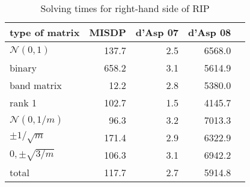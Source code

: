 \begin{table} 
 \begin{scriptsize} \caption{Solving times for right-hand side of RIP} 
 \label{rhsTime} 
 \begin{tabular*}{\linewidth}{@{}l@{\;\;\extracolsep{\fill}}rrrr@{}}\toprule 
 type of matrix & MISDP & d'Asp 07 & d'Asp 08 \\ \midrule 
$\mathcal{N}(0,1)$& \num{137.7} & \num{2.5} & \num{6568.0} \\ 
 binary& \num{658.2} & \num{3.1} & \num{5614.9} \\ 
 band matrix& \num{12.2} & \num{2.8} & \num{5380.0} \\ 
 rank 1& \num{102.7} & \num{1.5} & \num{4145.7} \\ 
 $\mathcal{N}(0,1/m)$& \num{96.3} & \num{3.2} & \num{7013.3} \\ 
 $\pm 1/\sqrt{m}$& \num{171.4} & \num{2.9} & \num{6322.9} \\ 
 $0, \pm \sqrt{3/m}$& \num{106.3} & \num{3.1} & \num{6942.2} \\ 
 \midrule 
total & \num{117.7} & \num{2.7} & \num{5914.8} \\ 
 \bottomrule 
 \end{tabular*} 
 \end{scriptsize} 
 \end{table} 
